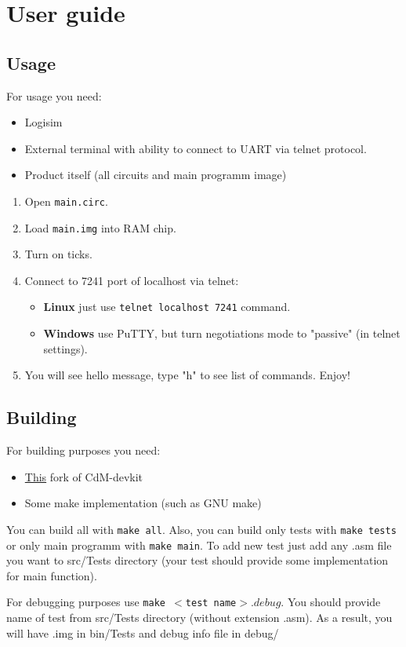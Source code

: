 \chapter*{User guide}

\section*{Usage}

For usage you need:

\begin{itemize}
	\item Logisim
	\item External terminal with ability to connect to UART via telnet protocol.
	\item Product itself (all circuits and main programm image)
\end{itemize}

\begin{enumerate}
	\item Open \texttt{main.circ}.
	\item Load \texttt{main.img} into RAM chip.
	\item Turn on ticks.
	\item Connect to 7241 port of localhost via telnet:
		\begin{itemize}
			\item \textbf{Linux} just use \texttt{telnet localhost 7241} command.
			\item \textbf{Windows} use PuTTY, but turn negotiations mode to "passive" (in telnet settings).
		\end{itemize}
	\item You will see hello message, type "h" to see list of commands. Enjoy!
\end{enumerate}

\section*{Building}

For building purposes you need:

\begin{itemize}
	\item \href{https://github.com/Proletcultist/cdm-devkit-macro-improvements}{This} fork of CdM-devkit
	\item Some make implementation (such as GNU make)
\end{itemize}

You can build all with \texttt{make all}. Also, you can build only tests with \texttt{make tests} or only main programm with \texttt{make main}. To add new test just add any .asm file you want to src/Tests directory (your test should provide some implementation for main function).

For debugging purposes use \texttt{make $<$test name$>.debug$}. You should provide name of test from src/Tests directory (without extension .asm). As a result, you will have .img in bin/Tests and debug info file in debug/
